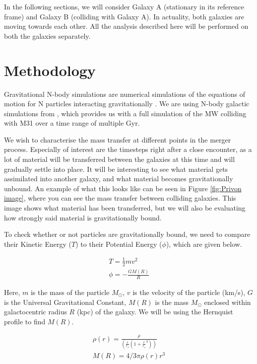 \documentclass[linenumbers]{aastex631} %
\begin{document}
In the following sections, we will consider Galaxy A (stationary in its reference frame) and Galaxy B (colliding with Galaxy A). In actuality, both galaxies are moving towards each other. All the analysis described here will be performed on both the galaxies separately.

\section{Methodology}

Gravitational N-body simulations are numerical simulations of the equations of motion for N particles interacting gravitationally \citep{trenti2008gravitational}. We are using N-body galactic simulations from \citep{Besla}, which provides us with a full simulation of the MW colliding with M31 over a time range of multiple Gyr. 

We wish to characterise the mass transfer at different points in the merger process. Especially of interest are the timesteps right after a close encounter, as a lot of material will be transferred between the galaxies at this time and will gradually settle into place. It will be interesting to see what material gets assimilated into another galaxy, and what material becomes gravitationally unbound. An example of what this looks like can be seen in Figure \ref{fig:Privon image}, where you can see the mass transfer between colliding galaxies. This image shows what material has been transferred, but we will also be evaluating how strongly said material is gravitationally bound. 


To check whether or not particles are gravitationally bound, we need to compare their Kinetic Energy ($T$) to their Potential Energy ($\phi$), which are given below.

\begin{gather}
T = \frac{1}{2} mv^2 \\
\phi = -\frac{GM(R)}{R}
\end{gather}

Here, $m$ is the mass of the particle $M_\odot$, $v$ is the velocity of the particle (km/s), $G$ is the Universal Gravitational Constant, $M(R)$ is the mass $M_\odot$ enclosed within galactocentric radius $R$ (kpc) of the galaxy. We will be using the Hernquist profile \citep{1990ApJ...356..359H} to find $M(R)$.

\begin{gather}
    \rho(r) = \frac{\rho}{(\frac{r}{r_s}(1+\frac{r}{r_s}^3))}\\
    M(R) = 4/3\pi\rho(r)r^3
\end{gather}
\end{document}
